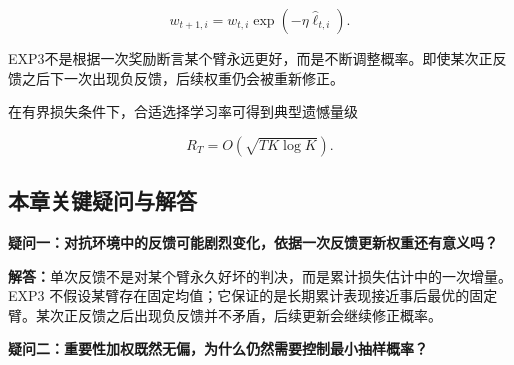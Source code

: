 \documentclass[
  11pt,
  a4paper,
]{ctexart}
\providecommand{\tightlist}{%
  \setlength{\itemsep}{0pt}\setlength{\parskip}{0pt}}
\begin{document}
\[
w_{t+1,i}=w_{t,i}\exp(-\eta\widehat\ell_{t,i}).
\]

EXP3不是根据一次奖励断言某个臂永远更好，而是不断调整概率。即使某次正反馈之后下一次出现负反馈，后续权重仍会被重新修正。

在有界损失条件下，合适选择学习率可得到典型遗憾量级

\[
R_T=O(\sqrt{TK\log K}).
\]

\subsection{本章关键疑问与解答}\label{ux672cux7ae0ux5173ux952eux7591ux95ee-4}

\textbf{疑问一：对抗环境中的反馈可能剧烈变化，依据一次反馈更新权重还有意义吗？}

\textbf{解答：}单次反馈不是对某个臂永久好坏的判决，而是累计损失估计中的一次增量。EXP3 不假设某臂存在固定均值；它保证的是长期累计表现接近事后最优的固定臂。某次正反馈之后出现负反馈并不矛盾，后续更新会继续修正概率。

\textbf{疑问二：重要性加权既然无偏，为什么仍然需要控制最小抽样概率？}
\end{document}
